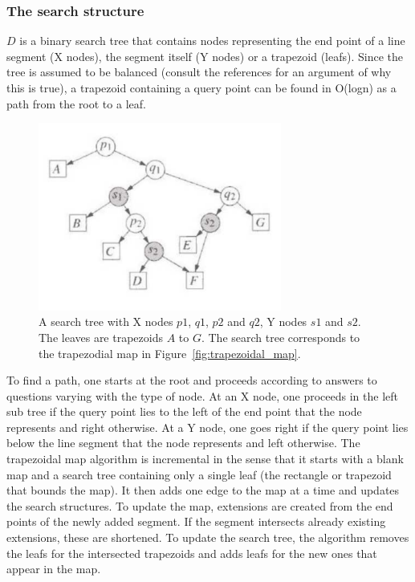\subsubsection{The search structure}
$D$ is a binary search tree that contains nodes representing the end point of a line segment (X nodes), the segment itself (Y nodes) or a trapezoid (leafs). Since the tree is assumed to be balanced (consult the references for an argument of why this is true), a trapezoid containing a query point can be found in O(logn) as a path from the root to a leaf. 

\begin{figure}[]
    \centering
      \includegraphics[width=80mm]{images/tree.pdf}
    \caption{A search tree with X nodes $p1$, $q1$, $p2$ and $q2$, Y nodes $s1$ and $s2$. The leaves are trapezoids $A$ to $G$. The search tree corresponds to the trapezodial map in Figure~\ref{fig:trapezoidal_map}.}
    \label{fig:tree}
\end{figure}

To find a path, one starts at the root and proceeds according to answers to questions varying with the type of node. At an X node, one proceeds in the left sub tree if the query point lies to the left of the end point that the node represents and right otherwise. At a Y node, one goes right if the query point lies below the line segment that the node represents and left otherwise.
The trapezoidal map algorithm is incremental in the sense that it starts with a blank map and a search tree containing only a single leaf (the rectangle or trapezoid that bounds the map). It then adds one edge to the map at a time and updates the search structures. To update the map, extensions are created from the end points of the newly added segment. If the segment intersects already existing extensions, these are shortened. To update the search tree, the algorithm removes the leafs for the intersected trapezoids and adds leafs for the new ones that appear in the map.

